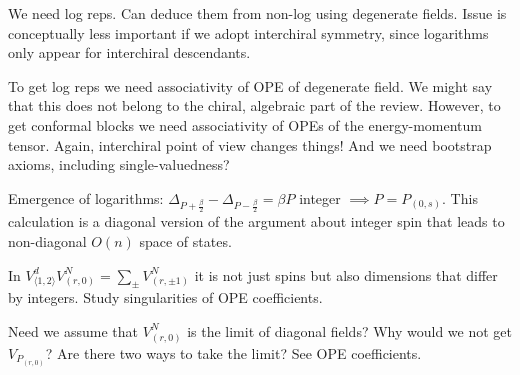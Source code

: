 \documentclass[12pt, a4paper]{article}
\theoremstyle{break}
\begin{document}
We need log reps. Can deduce them from non-log using degenerate fields. Issue is conceptually less important if we adopt interchiral symmetry, since logarithms only appear for interchiral descendants. 

To get log reps we need associativity of OPE of degenerate field. We might say that this does not belong to the chiral, algebraic part of the review. However, to get conformal blocks we need associativity of OPEs of the energy-momentum tensor. Again, interchiral point of view changes things! And we need bootstrap axioms, including single-valuedness? 

Emergence of logarithms: $\Delta_{P+\frac{\beta}{2}}-\Delta_{P-\frac{\beta}{2}} = \beta P$ integer $\implies P=P_{(0,s)}$. This calculation is a diagonal version of the argument about integer spin that leads to non-diagonal $O(n)$ space of states.

In $V^d_{\langle 1,2\rangle}V^N_{(r,0)} = \sum_\pm V^N_{(r,\pm 1)}$ it is not just spins but also dimensions that differ by integers. Study singularities of OPE coefficients. 

Need we assume that $V^N_{(r,0)}$ is the limit of diagonal fields? Why would we not get $V_{P_{(r,0)}}$? Are there two ways to take the limit? See OPE coefficients. 




%
\end{document}
